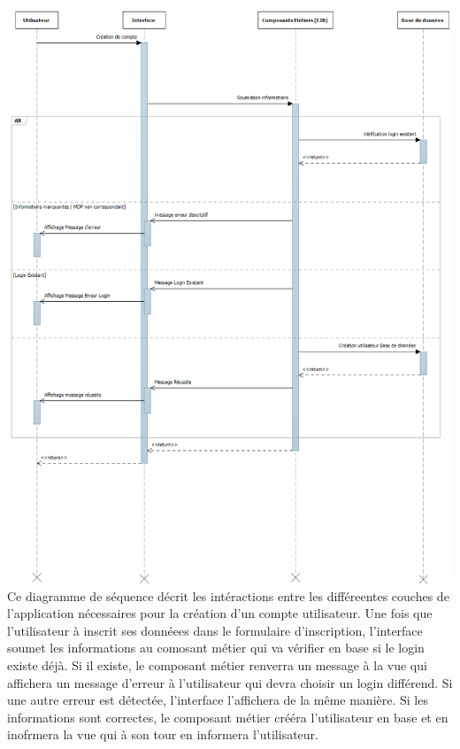 \includegraphics[scale=0.37]{Res/accountCreationSequence.png}
Ce diagramme de séquence décrit les intéractions entre les différeentes couches de l'application nécessaires pour la création d'un compte utilisateur.
Une fois que l'utilisateur à inscrit ses donnéees dans le formulaire d'inscription, l'interface soumet les informations au comosant métier qui va vérifier en base si le login existe déjà.
Si il existe, le composant métier renverra un message à la vue qui affichera un message d'erreur à l'utilisateur qui devra choisir un login différend.
Si une autre erreur est détectée, l'interface l'affichera de la même manière.
Si les informations sont correctes, le composant métier crééra l'utilisateur en base et en inofrmera la vue qui à son tour en informera l'utilisateur.
\clearpage
